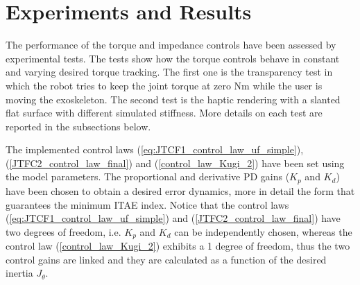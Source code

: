\documentclass[journal]{IEEEtran}
\begin{document}



\section{Experiments and Results} \label{sec:experimentsResults}

The performance of the torque and impedance controls have been assessed by experimental tests. 
The tests show how the torque controls behave in constant and varying desired torque tracking.
The first one is the transparency test in which the robot tries to keep the joint torque at zero Nm while the user is moving the exoskeleton.
The second test is the haptic rendering with a slanted flat surface with different simulated stiffness.
More details on each test are reported in the subsections below.
\par The implemented control laws (\ref{eq:JTCF1_control_law_uf_simple}), (\ref{JTFC2_control_law_final}) and (\ref{control_law_Kugi_2}) have been set using the model parameters. The proportional and derivative PD gains ($K_p$ and $K_d$) have been chosen to obtain a desired error dynamics, more in detail the form that guarantees the minimum ITAE index. Notice that the control laws (\ref{eq:JTCF1_control_law_uf_simple}) and (\ref{JTFC2_control_law_final}) have two degrees of freedom, i.e. $K_p$ and $K_d$ can be independently chosen, whereas the control law (\ref{control_law_Kugi_2}) exhibits a 1 degree of freedom, thus the two control gains are linked and they are calculated as a function of the desired inertia $J_{\theta}$.

\end{document}
